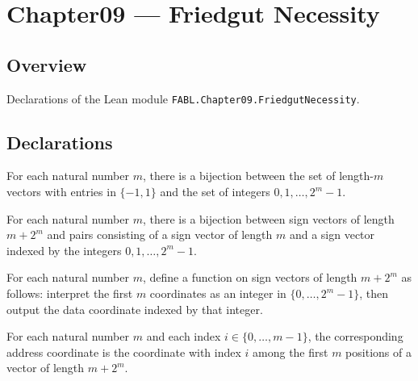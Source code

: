 \chapter{Chapter09 — Friedgut Necessity}
\section{Overview}

Declarations of the Lean module \texttt{FABL.Chapter09.FriedgutNecessity}.

\section{Declarations}

\begin{definition}
\label{FABL.addressingAddressEquiv}
\leanok
{}
For each natural number $m$, there is a bijection between the set of length-$m$ vectors
with entries in $\{-1,1\}$ and the set of integers $0,1,\ldots,2^m-1$.
\end{definition}

\begin{definition}
\label{FABL.addressingInputEquiv}
\leanok
{}
For each natural number $m$, there is a bijection between sign vectors of length $m+2^m$
and pairs consisting of a sign vector of length $m$ and a sign vector indexed by the
integers $0,1,\ldots,2^m-1$.
\end{definition}

\begin{definition}
\label{FABL.addressingFunction}
\leanok
{}
For each natural number $m$, define a function on sign vectors of length $m+2^m$ as
follows: interpret the first $m$ coordinates as an integer in $\{0,\ldots,2^m-1\}$, then
output the data coordinate indexed by that integer.
\end{definition}

\begin{definition}
\label{FABL.addressingAddressCoordinate}
\leanok
For each natural number $m$ and each index $i\in\{0,\ldots,m-1\}$, the corresponding
address coordinate is the coordinate with index $i$ among the first $m$ positions of a
vector of length $m+2^m$.
\end{definition}

